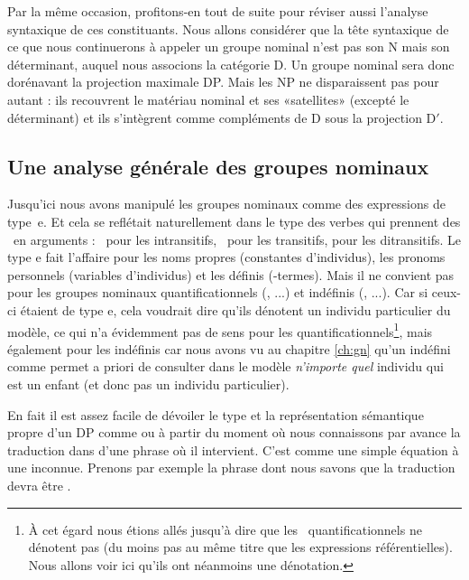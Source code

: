 Par la même occasion, profitons-en tout de suite pour réviser aussi l'analyse syntaxique de ces constituants. 
Nous allons considérer que la tête syntaxique de ce que nous continuerons à appeler un groupe nominal n'est pas son N mais son  déterminant, auquel nous associons la catégorie D.  
Un groupe nominal sera donc dorénavant la projection maximale DP.  Mais les NP ne disparaissent pas pour autant : ils recouvrent le matériau nominal et ses «satellites» (excepté le déterminant) et ils s'intègrent comme compléments de D sous la projection D$'$. 


\subsection{Une analyse générale des groupes nominaux}
\label{ss:QG.1}

Jusqu'ici nous avons manipulé les groupes nominaux comme des expressions de type~\typ e.  Et cela se reflétait naturellement dans le type des verbes qui prennent des \GN\ en arguments : \et\ pour les intransitifs, \eet\ pour les transitifs,  pour les ditransitifs. 
Le type \typ e fait l'affaire pour les noms propres (constantes d'individus), les pronoms personnels (variables d'individus) et les définis (\atoi-termes).  Mais il ne convient pas pour les groupes nominaux quantificationnels (, ...) et indéfinis (, ...). Car si ceux-ci étaient de type \typ e, cela voudrait dire qu'ils dénotent un individu particulier du modèle, ce qui n'a évidemment pas de sens pour les quantificationnels\footnote{À cet égard nous étions allés jusqu'à dire que les \GN\ quantificationnels ne dénotent pas (du moins pas au même titre que les expressions référentielles).  Nous allons voir ici qu'ils ont néanmoins une dénotation.}, mais également pour les indéfinis car nous avons vu au chapitre \ref{ch:gn} qu'un indéfini comme  permet a priori de consulter dans le modèle \emph{n'importe quel} individu qui est un enfant (et donc pas un individu particulier). 


En fait il est assez facile de dévoiler le type et la représentation sémantique propre d'un DP comme  ou  à partir du moment où nous connaissons par avance la traduction dans {\LO} d'une phrase où il intervient. C'est comme une simple équation à une inconnue.
Prenons par exemple la phrase \Next[a] dont nous savons que la traduction devra être \Next[b].
 
